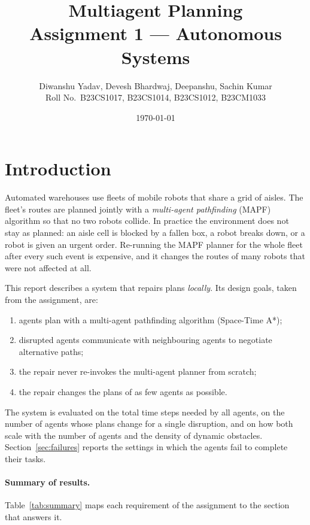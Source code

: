 \documentclass[11pt,a4paper]{article}
\title{\textbf{Multiagent Planning}\\[0.6em]
\large Assignment 1 --- Autonomous Systems}
\author{Diwanshu Yadav, Devesh Bhardwaj, Deepanshu, Sachin Kumar \\ Roll No.\ B23CS1017, B23CS1014, B23CS1012, B23CM1033 \\ \texttt{}}
\date{\today}
\begin{document}
\maketitle
\thispagestyle{empty}


\tableofcontents
\newpage

\section{Introduction}

Automated warehouses use fleets of mobile robots that share a grid of aisles. The fleet's routes are
planned jointly with a \emph{multi-agent pathfinding} (MAPF) algorithm so that no two robots collide.
In practice the environment does not stay as planned: an aisle cell is blocked by a fallen box, a robot
breaks down, or a robot is given an urgent order. Re-running the MAPF planner for the whole fleet after
every such event is expensive, and it changes the routes of many robots that were not affected at all.

This report describes a system that repairs plans \emph{locally}. Its design goals, taken from the
assignment, are:
\begin{enumerate}
  \item agents plan with a multi-agent pathfinding algorithm (Space-Time A*);
  \item disrupted agents communicate with neighbouring agents to negotiate alternative paths;
  \item the repair never re-invokes the multi-agent planner from scratch;
  \item the repair changes the plans of as few agents as possible.
\end{enumerate}
The system is evaluated on the total time steps needed by all agents, on the number of agents whose
plans change for a single disruption, and on how both scale with the number of agents and the density of
dynamic obstacles. Section~\ref{sec:failures} reports the settings in which the agents fail to complete
their tasks.

\paragraph{Summary of results.}
Table~\ref{tab:summary} maps each requirement of the assignment to the section that answers it.
\end{document}
